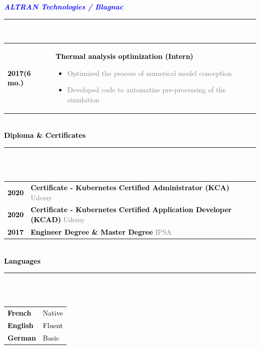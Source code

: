 \documentclass[12pt,A4]{article}
\begin{document}
\begin{minipage}[t]{0.68\textwidth}
\begin{tabular}{P{2.5cm}p{10cm}}
\end{tabular}
\textcolor{blue}{\bf \textit{ALTRAN Technologies / Blagnac}}\hfill\textcolor{gray!40}{\rule{5cm}{2mm}}\\
\begin{tabular}{P{2.5cm}p{10cm}}
\textcolor{black}{\bf 2017(6 mo.)} & \textcolor{black}{\bf Thermal analysis optimization (Intern)}
\begin{itemize}
  \item \small \textcolor{gray}{Optimized the process of numerical model conception}
  \item \small \textcolor{gray}{Developed code to automatize pre-processing of the simulation}
\end{itemize}\\
\end{tabular}
%
%
\vspace*{0cm}\\
\textcolor{black}{\large \bf Diploma \& Certificates \vspace{-5pt}\\}
\noindent\textcolor{blue}{\rule{13cm}{.8mm}}\\
%
\vspace*{-5pt}\\
\begin{tabular}{P{2.5cm}p{10cm}}
\textcolor{black}{\bf 2020} & \textcolor{black}{ \bf Certificate - Kubernetes Certified Administrator (KCA)}  \newline \small \textcolor{gray}{Udemy} \\
\textcolor{black}{\bf 2020} & \textcolor{black}{ \bf Certificate - Kubernetes Certified Application Developer (KCAD)} \newline \small \textcolor{gray}{Udemy} \\
\textcolor{black}{\bf 2017} & \textcolor{black}{ \bf Engineer Degree \& Master Degree} \newline \small \textcolor{gray}{IPSA} \\
\end{tabular}
%
%
\vspace*{0.5cm}\\
\textcolor{black}{\large \bf Languages \vspace{-5pt}\\}
\noindent\textcolor{blue}{\rule{13cm}{.8mm}}\\
%
\vspace*{-5pt}\\
\begin{tabular}{p{2.5cm}p{10cm}}
\textcolor{black}{\bf French} & \textcolor{black}{ Native } \\
\textcolor{black}{\bf English} & \textcolor{black}{ Fluent } \\
\textcolor{black}{\bf German} & \textcolor{black}{ Basic } \\
\end{tabular}
\end{minipage}
\end{document}
